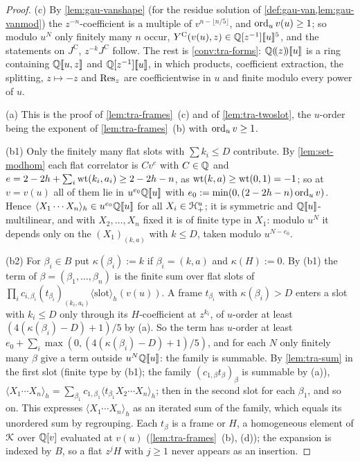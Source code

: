 \begin{proof}
(c) By \cref{lem:gau-vanshape} (for the residue solution of \cref{def:gau-van,lem:gau-vanmod}) the $z^{-n}$-coefficient is a multiple of $v^{n-\lfloor n/5\rfloor}$, and $\operatorname{ord}_uv(u)\geq 1$; so modulo $u^N$ only finitely many $n$ occur, $Y^{\mathrm{C}}(v(u),z)\in\mathbb{Q}[z^{-1}][\![ u ]\!]^5$, and the statements on $J^{\mathrm C}$, $z^{-k}J^{\mathrm C}$ follow. The rest is \cref{conv:tra-forms}: $\mathbb{Q}(\!(z)\!)[\![ u ]\!]$ is a ring containing $\mathbb{Q}[\![ u,z ]\!]$ and $\mathbb{Q}[z^{-1}][\![ u ]\!]$, in which products, coefficient extraction, the splitting, $z\mapsto -z$ and $\operatorname*{Res}_z$ are coefficientwise in $u$ and finite modulo every power of $u$.

(a) This is the proof of \cref{lem:tra-frames}~(c) and of \cref{lem:tra-twoslot}, the $u$-order being the exponent of \cref{lem:tra-frames}~(b) with $\operatorname{ord}_uv\geq 1$.

(b1) Only the finitely many flat slots with $\sum k_i\leq D$ contribute. By \cref{lem:set-modhom} each flat correlator is $Cv^e$ with $C\in\mathbb{Q}$ and $e = 2-2h+\sum_i\operatorname{wt}(k_i,a_i)\geq 2-2h-n$, as $\operatorname{wt}(k,a)\geq\operatorname{wt}(0,1) = -1$; so at $v = v(u)$ all of them lie in $u^{e_0}\mathbb{Q}[\![ u ]\!]$ with $e_0 := \min(0,(2-2h-n)\operatorname{ord}_uv)$. Hence $\langle X_1\cdots X_n\rangle_h\in u^{e_0}\mathbb{Q}[\![ u ]\!]$ for all $X_i\in\mathcal{H}^u_+$; it is symmetric and $\mathbb{Q}[\![ u ]\!]$-multilinear, and with $X_2,\dots,X_n$ fixed it is of finite type in $X_1$: modulo $u^N$ it depends only on the $(X_1)_{(k,a)}$ with $k\leq D$, taken modulo $u^{N-e_0}$.

(b2) For $\beta_i\in B$ put $\kappa(\beta_i) := k$ if $\beta_i = (k,a)$ and $\kappa(H) := 0$. By (b1) the term of $\beta = (\beta_1,\dots,\beta_n)$ is the finite sum over flat slots of $\prod_ic_{i,\beta_i}(t_{\beta_i})_{(k_i,a_i)}\langle\text{slot}\rangle_h(v(u))$. A frame $t_{\beta_i}$ with $\kappa(\beta_i)>D$ enters a slot with $k_i\leq D$ only through its $H$-coefficient at $z^{k_i}$, of $u$-order at least $(4(\kappa(\beta_i)-D)+1)/5$ by (a). So the term has $u$-order at least $e_0+\sum_i\max(0,(4(\kappa(\beta_i)-D)+1)/5)$, and for each $N$ only finitely many $\beta$ give a term outside $u^N\mathbb{Q}[\![ u ]\!]$: the family is summable. By \cref{lem:tra-sum} in the first slot (finite type by (b1); the family $(c_{1,\beta}t_\beta)_\beta$ is summable by (a)), $\langle X_1\cdots X_n\rangle_h = \sum_{\beta_1}c_{1,\beta_1}\langle t_{\beta_1}X_2\cdots X_n\rangle_h$; then in the second slot for each $\beta_1$, and so on. This expresses $\langle X_1\cdots X_n\rangle_h$ as an iterated sum of the family, which equals its unordered sum by regrouping. Each $t_\beta$ is a frame or $H$, a homogeneous element of $\mathcal{K}$ over $\mathbb{Q}[v]$ evaluated at $v(u)$ (\cref{lem:tra-frames}~(b), (d)); the expansion is indexed by $B$, so a flat $z^jH$ with $j\geq 1$ never appears as an insertion.


\end{proof}
